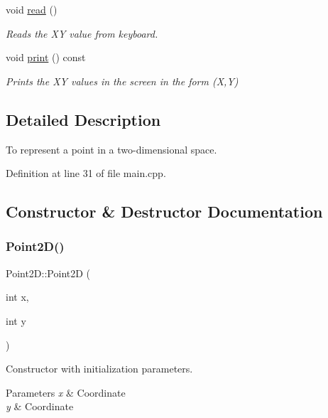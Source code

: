 \begin{DoxyCompactItemize}
\mbox{\label{classPoint2D_ac13d12003e2da9afee19a6a3f526c660}} 
void \hyperlink{classPoint2D_ac13d12003e2da9afee19a6a3f526c660}{read} ()
\begin{DoxyCompactList}\small\item\em Reads the XY value from keyboard. \end{DoxyCompactList}\item 
\mbox{\label{classPoint2D_a4be0cc5bb62eef12bfa55ced97d03535}} 
void \hyperlink{classPoint2D_a4be0cc5bb62eef12bfa55ced97d03535}{print} () const
\begin{DoxyCompactList}\small\item\em Prints the XY values in the screen in the form (X,Y) \end{DoxyCompactList}\end{DoxyCompactItemize}


\subsection{Detailed Description}
To represent a point in a two-\/dimensional space. 

Definition at line 31 of file main.\+cpp.



\subsection{Constructor \& Destructor Documentation}
\mbox{\label{classPoint2D_a925d8fbd28c1bec7ff05f24c9ce8d182}} 
\subsubsection{\texorpdfstring{Point2\+D()}{Point2D()}}
{\footnotesize\ttfamily Point2\+D\+::\+Point2D (\begin{DoxyParamCaption}\item[{int}]{x,  }\item[{int}]{y }\end{DoxyParamCaption})\hspace{0.3cm}{\ttfamily [inline]}}



Constructor with initialization parameters. 


\begin{DoxyParams}{Parameters}
{\em x} & Coordinate \\
\hline
{\em y} & Coordinate \\
\hline
\end{DoxyParams}


